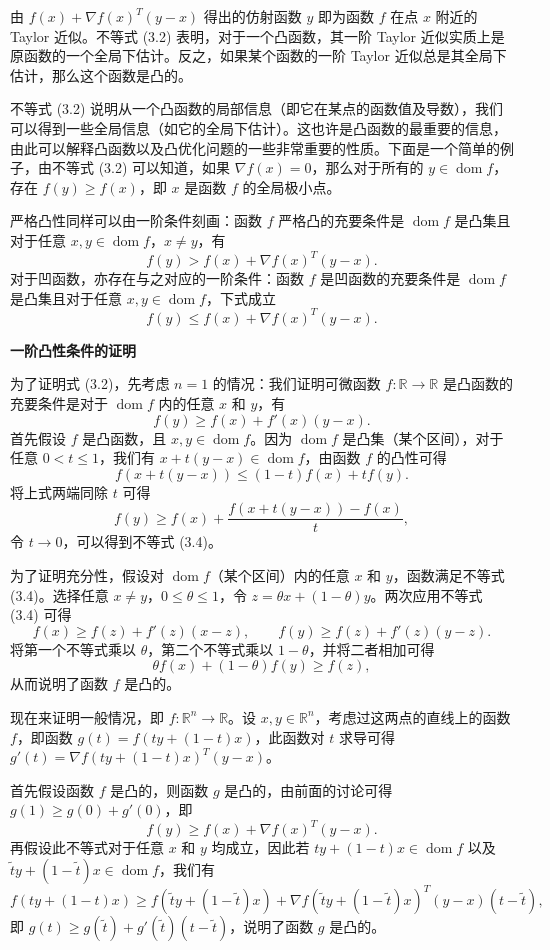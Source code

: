 \documentclass[UTF8,12pt,a4paper,fontset=fandol]{ctexart}
\DeclareMathOperator{\dom}{dom}
\begin{document}
由 $f(x)+\nabla f(x)^T(y-x)$ 得出的仿射函数 $y$ 即为函数 $f$ 在点 $x$ 附近的 Taylor 近似。不等式 (3.2) 表明，对于一个凸函数，其一阶 Taylor 近似实质上是原函数的一个全局下估计。反之，如果某个函数的一阶 Taylor 近似总是其全局下估计，那么这个函数是凸的。

不等式 (3.2) 说明从一个凸函数的局部信息（即它在某点的函数值及导数），我们可以得到一些全局信息（如它的全局下估计）。这也许是凸函数的最重要的信息，由此可以解释凸函数以及凸优化问题的一些非常重要的性质。下面是一个简单的例子，由不等式 (3.2) 可以知道，如果 $\nabla f(x)=0$，那么对于所有的 $y\in\dom f$，存在 $f(y)\geq f(x)$，即 $x$ 是函数 $f$ 的全局极小点。

严格凸性同样可以由一阶条件刻画：函数 $f$ 严格凸的充要条件是 $\dom f$ 是凸集且对于任意 $x,y\in\dom f$，$x\neq y$，有
\begin{equation}
f(y)>f(x)+\nabla f(x)^T(y-x).
\tag{3.3}
\end{equation}
对于凹函数，亦存在与之对应的一阶条件：函数 $f$ 是凹函数的充要条件是 $\dom f$ 是凸集且对于任意 $x,y\in\dom f$，下式成立
\[
f(y)\leq f(x)+\nabla f(x)^T(y-x).
\]

\noindent\textbf{一阶凸性条件的证明}

为了证明式 (3.2)，先考虑 $n=1$ 的情况：我们证明可微函数 $f:\mathbb{R}\to\mathbb{R}$ 是凸函数的充要条件是对于 $\dom f$ 内的任意 $x$ 和 $y$，有
\begin{equation}
f(y)\geq f(x)+f'(x)(y-x).
\tag{3.4}
\end{equation}
首先假设 $f$ 是凸函数，且 $x,y\in\dom f$。因为 $\dom f$ 是凸集（某个区间），对于任意 $0<t\leq 1$，我们有 $x+t(y-x)\in\dom f$，由函数 $f$ 的凸性可得
\[
f(x+t(y-x))\leq (1-t)f(x)+tf(y).
\]
将上式两端同除 $t$ 可得
\[
f(y)\geq f(x)+\frac{f(x+t(y-x))-f(x)}{t},
\]
令 $t\to0$，可以得到不等式 (3.4)。

为了证明充分性，假设对 $\dom f$（某个区间）内的任意 $x$ 和 $y$，函数满足不等式 (3.4)。选择任意 $x\neq y$，$0\leq\theta\leq 1$，令 $z=\theta x+(1-\theta)y$。两次应用不等式 (3.4) 可得
\[
f(x)\geq f(z)+f'(z)(x-z),\qquad f(y)\geq f(z)+f'(z)(y-z).
\]
将第一个不等式乘以 $\theta$，第二个不等式乘以 $1-\theta$，并将二者相加可得
\[
\theta f(x)+(1-\theta)f(y)\geq f(z),
\]
从而说明了函数 $f$ 是凸的。

现在来证明一般情况，即 $f:\mathbb{R}^n\to\mathbb{R}$。设 $x,y\in\mathbb{R}^n$，考虑过这两点的直线上的函数 $f$，即函数 $g(t)=f(ty+(1-t)x)$，此函数对 $t$ 求导可得 $g'(t)=\nabla f(ty+(1-t)x)^T(y-x)$。

首先假设函数 $f$ 是凸的，则函数 $g$ 是凸的，由前面的讨论可得 $g(1)\geq g(0)+g'(0)$，即
\[
f(y)\geq f(x)+\nabla f(x)^T(y-x).
\]
再假设此不等式对于任意 $x$ 和 $y$ 均成立，因此若 $ty+(1-t)x\in\dom f$ 以及 $\tilde t y+(1-\tilde t)x\in\dom f$，我们有
\[
f(ty+(1-t)x)\geq f(\tilde t y+(1-\tilde t)x)+\nabla f(\tilde t y+(1-\tilde t)x)^T(y-x)(t-\tilde t),
\]
即 $g(t)\geq g(\tilde t)+g'(\tilde t)(t-\tilde t)$，说明了函数 $g$ 是凸的。
\end{document}
